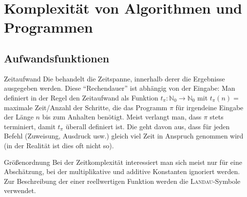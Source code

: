 \section{%
    Komplexität von Algorithmen und Programmen%
}

\subsection{%
    Aufwandsfunktionen%
}

\begin{Def}{Zeitaufwand}
    Die  behandelt die Zeitspanne, innerhalb derer
    die Ergebnisse ausgegeben werden.
    Diese "`Rechendauer"' ist abhängig von der Eingabe:
    Man definiert in der Regel den Zeitaufwand als Funktion
    $t_\pi: \mathbb{N}_0 \rightarrow \mathbb{N}_0$ mit $t_\pi(n) =$ maximale
    Zeit/Anzahl der Schritte, die das Programm $\pi$ für irgendeine Eingabe der
    Länge $n$ bis zum Anhalten benötigt.
    Meist verlangt man, dass $\pi$ stets terminiert, damit $t_\pi$ überall
    definiert ist.
    Die  geht davon aus, dass für jeden
    Befehl (Zuweisung, Ausdruck usw.) gleich viel Zeit in Anspruch genommen
    wird (in der Realität ist dies oft nicht so).
\end{Def}

\begin{Def}{Größenordnung}
    Bei der Zeitkomplexität interessiert man sich meist nur für eine
    Abschätzung, bei der multiplikative und additive Konstanten ignoriert
    werden.
    Zur Beschreibung der  einer
    reellwertigen Funktion werden die \textsc{Landau}-Symbole verwendet.
\end{Def}

